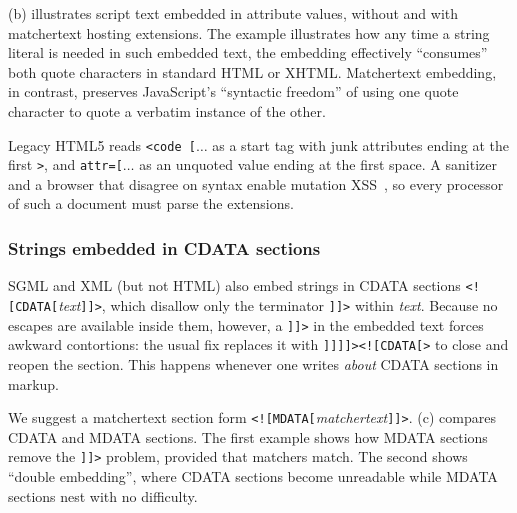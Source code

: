(b) illustrates
script text embedded in attribute values,
without and with matchertext hosting extensions.
The example illustrates how any time
a string literal is needed in such embedded text,
the embedding effectively ``consumes'' both quote characters
in standard HTML or XHTML.
Matchertext embedding, in contrast,
preserves JavaScript's ``syntactic freedom''
of using one quote character to quote a verbatim instance of the other.

Legacy HTML5 reads \verb|<code [|$\dots$ as a start tag
with junk attributes ending at the first \verb|>|,
and \verb|attr=[|$\dots$ as an unquoted value ending at the first space.
A sanitizer and a browser that disagree on syntax
enable mutation XSS~\cite{heiderich13mxss},
so every processor of such a document must parse the extensions.


\subsubsection{Strings embedded in CDATA sections}
\label{sec:host:ml:section}

SGML and XML (but not HTML) also embed strings
in CDATA sections \verb|<![CDATA[|\emph{text}\verb|]]>|,
which disallow only the terminator \verb|]]>| within \emph{text}.
Because no escapes are available inside them, however,
a \verb|]]>| in the embedded text forces awkward contortions:
the usual fix replaces it with \verb|]]]]><![CDATA[>|
to close and reopen the section.
This happens whenever one writes \emph{about} CDATA sections
in \ml markup.

We suggest a matchertext section form
\verb|<![MDATA[|\emph{matchertext}\verb|]]>|.
(c) compares CDATA and MDATA sections.
The first example shows how MDATA sections remove the \verb|]]>| problem,
provided that matchers match.
The second shows ``double embedding'',
where CDATA sections become unreadable
while MDATA sections nest with no difficulty.

